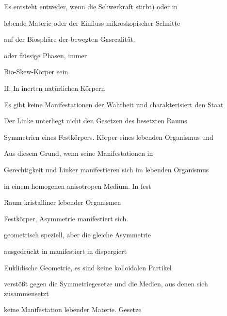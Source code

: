 \documentclass[11pt,a4paper]{book}
\begin{document}
Es entsteht entweder, wenn die Schwerkraft stirbt) oder in



lebende Materie oder der Einfluss mikroskopischer Schnitte



auf der Biosphäre der bewegten Gasrealität.



oder flüssige Phasen, immer



Bio-Skew-Körper sein.



 



II. In inerten natürlichen Körpern



Es gibt keine Manifestationen der Wahrheit und charakterisiert den Staat



Der Linke unterliegt nicht den Gesetzen des besetzten Raums



Symmetrien eines Festkörpers. Körper eines lebenden Organismus und



Aus diesem Grund, wenn seine Manifestationen in



Gerechtigkeit und Linker manifestieren sich im lebenden Organismus



in einem homogenen anisotropen Medium. In fest



Raum kristalliner lebender Organismen



Festkörper, Asymmetrie manifestiert sich.



geometrisch speziell, aber die gleiche Asymmetrie



ausgedrückt in manifestiert in dispergiert



Euklidische Geometrie, es sind keine kolloidalen Partikel



verstößt gegen die Symmetriegesetze und die Medien, aus denen sich zusammensetzt



keine Manifestation lebender Materie. Gesetze
\end{document}
